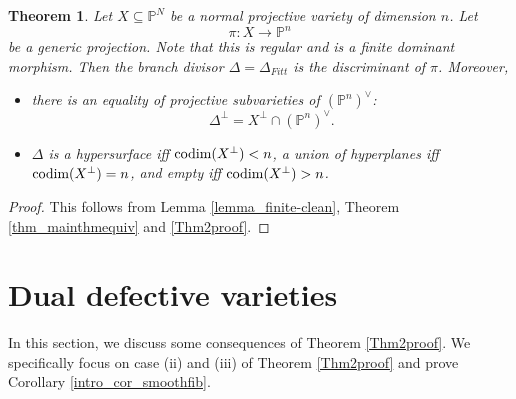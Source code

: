 \documentclass[12pt]{amsart}
\newtheorem{theorem}{Theorem}[section]
\begin{document}
\begin{theorem}\label{thm_finite-normal}
     Let $X\subseteq \mathbb P^N$ be a normal projective variety of dimension $n$. Let $$\pi:X\to \mathbb P^n$$ be a generic projection. Note that this is regular and is a finite dominant morphism. Then the branch divisor $\Delta=\Delta_{Fitt}$ is the discriminant of $\pi$. Moreover,
     \begin{itemize}
         \item[(1)]  there is an equality of projective subvarieties of $(\mathbb P^n)^{\vee}$:
     $$ \Delta^{\perp}= X^{\perp}\cap (\mathbb P^n)^{\vee}.$$ 
     \item[(2)] $\Delta$ is a hypersurface iff $\textup{codim}(X^{\perp})<n$, a union of hyperplanes iff $\textup{codim}(X^{\perp})=n$, and empty iff $\textup{codim}(X^{\perp})>n$.
     \end{itemize}
     
    
\end{theorem}
\begin{proof}
    This follows from Lemma \ref{lemma_finite-clean}, Theorem \ref{thm_mainthmequiv} and \ref{Thm2proof}.
\end{proof}


\section{Dual defective varieties}\label{sec_emptydisc}
In this section, we discuss some consequences of Theorem \ref{Thm2proof}. We specifically focus on case (ii) and (iii) of Theorem \ref{Thm2proof} and prove Corollary \ref{intro_cor_smoothfib}.


\end{document}
